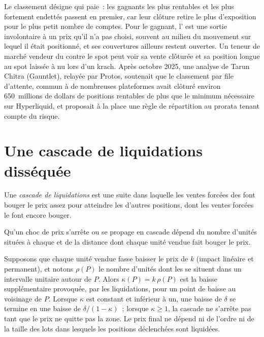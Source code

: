 Le classement désigne qui paie~: les gagnants les plus rentables et les plus fortement endettés passent en premier, car leur clôture retire
le plus d'exposition pour le plus petit nombre de comptes. Pour le gagnant, l' est une sortie involontaire à un prix
qu'il n'a pas choisi, souvent au milieu du mouvement sur lequel il était positionné, et ses couvertures ailleurs restent ouvertes. Un
teneur de marché vendeur du  contre le spot peut voir sa vente clôturée et sa position longue au spot laissée à nu lors d'un krach. Après
octobre 2025, une analyse de Tarun Chitra (Gauntlet), relayée par Protos, soutenait que le classement par file d'attente, commun à
de nombreuses plateformes avait clôturé environ 650~millions de dollars de positions rentables de plus que le minimum nécessaire sur Hyperliquid, et
proposait à la place une règle de répartition au prorata tenant compte du risque.

\section{Une cascade de liquidations disséquée}

\begin{definition}\label{def:m3:margin-liquidation-and-loss-allocation:cascade}
Une \emph{cascade de liquidations} est une suite dans laquelle les ventes forcées des 
font bouger le prix assez pour atteindre les  d'autres positions, dont les ventes forcées le font encore bouger.
\end{definition}

Qu'un choc de prix s'arrête ou se propage en cascade dépend du nombre d'unités situées à chaque  et de la distance
dont chaque unité vendue fait bouger le prix.

\begin{proposition}\label{prop:m3:margin-liquidation-and-loss-allocation:kappa}
Supposons que chaque unité vendue fasse baisser le prix de $k$ (impact linéaire et permanent), et notons $\rho(P)$ le nombre d'unités
dont les  se situent dans un intervalle unitaire autour de $P$. Alors $\kappa(P) = k\,\rho(P)$ est la baisse supplémentaire provoquée,
par les liquidations, pour un point de baisse au voisinage de $P$. Lorsque $\kappa$ est constant et inférieur à un, une baisse de $\delta$ se termine
en une baisse de $\delta/(1 - \kappa)$~; lorsque $\kappa \ge 1$, la cascade ne s'arrête pas tant que le prix ne quitte pas la zone.
Le prix final ne dépend ni de l'ordre ni de la taille des lots dans lesquels les positions déclenchées sont liquidées.
\end{proposition}

